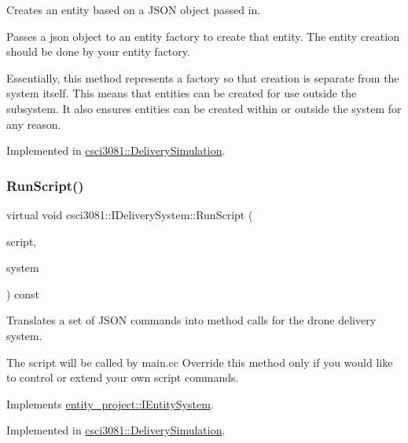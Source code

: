 Creates an entity based on a J\+S\+ON object passed in. 

Passes a json object to an entity factory to create that entity. The entity creation should be done by your entity factory.

Essentially, this method represents a factory so that creation is separate from the system itself. This means that entities can be created for use outside the subsystem. It also ensures entities can be created within or outside the system for any reason. 

Implemented in \hyperlink{classcsci3081_1_1DeliverySimulation_a2441732ada38ae3b816266c9d471e528}{csci3081\+::\+Delivery\+Simulation}.

\mbox{\label{classcsci3081_1_1IDeliverySystem_ae152276130e859b052f1d89417be6fc2}} 
\subsubsection{\texorpdfstring{Run\+Script()}{RunScript()}}
{\footnotesize\ttfamily virtual void csci3081\+::\+I\+Delivery\+System\+::\+Run\+Script (\begin{DoxyParamCaption}\item[{const picojson\+::array \&}]{script,  }\item[{\hyperlink{classentity__project_1_1IEntitySystem}{I\+Entity\+System} $\ast$}]{system }\end{DoxyParamCaption}) const\hspace{0.3cm}{\ttfamily [pure virtual]}}



Translates a set of J\+S\+ON commands into method calls for the drone delivery system. 

The script will be called by main.\+cc Override this method only if you would like to control or extend your own script commands. 

Implements \hyperlink{classentity__project_1_1IEntitySystem_a57a31878f9ae43f2ac3e70aa1903b8ec}{entity\+\_\+project\+::\+I\+Entity\+System}.



Implemented in \hyperlink{classcsci3081_1_1DeliverySimulation_a332938cb4b972af169ad58dbc1b3bb05}{csci3081\+::\+Delivery\+Simulation}.

